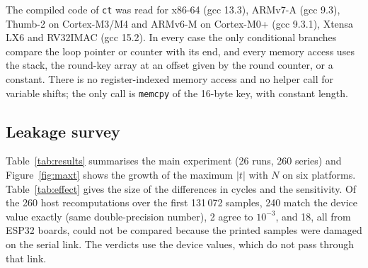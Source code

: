 \documentclass[11pt, a4paper, twoside, reqno]{article}
\newcommand{\tsm}{\texttt{small}}
\newcommand{\tfa}{\texttt{fast}}
\newcommand{\tfc}{\texttt{fast\_const}}
\newcommand{\tct}{\texttt{ct}}
\newcommand{\tlk}{\texttt{leaky}}
\begin{document}
The compiled code of \tct{} was read for x86-64 (gcc 13.3), ARMv7-A (gcc 9.3), Thumb-2 on Cortex-M3/M4 and ARMv6-M on Cortex-M0+ (gcc 9.3.1), Xtensa LX6 and RV32IMAC (gcc 15.2). In every case the only conditional branches compare the loop pointer or counter with its end, and every memory access uses the stack, the round-key array at an offset given by the round counter, or a constant. There is no register-indexed memory access and no helper call for variable shifts; the only call is \texttt{memcpy} of the 16-byte key, with constant length.

\subsection{Leakage survey}

Table~\ref{tab:results} summarises the main experiment (26 runs, 260 series) and Figure~\ref{fig:maxt} shows the growth of the maximum $|t|$ with $N$ on six platforms. Table~\ref{tab:effect} gives the size of the differences in cycles and the sensitivity. Of the 260 host recomputations over the first 131\,072 samples, 240 match the device value exactly (same double-precision number), 2 agree to $10^{-3}$, and 18, all from ESP32 boards, could not be compared because the printed samples were damaged on the serial link. The verdicts use the device values, which do not pass through that link.

\begin{table}[!htbp]
\centering
\caption{Maximum $|t|$ per implementation and test in the main experiment. Each cell gives the \emph{smaller} of the two values from the two independent runs, so a \textbf{bold} value means that the leak appeared in both runs ($|t|>4.5$ in each). Plain: no leak found. $^{\dagger}$: unclear (only one run above 4.5). $=$: every measurement had the same cycle count. sm = \tsm{}, fa = \tfa{}, fc = \tfc{}, lk = \tlk{}. Cache: memory between the core and the constant tables (Table~\ref{tab:platforms}). $N=10^6$ per run unless stated; the two ESP32 Wi-Fi runs used the same board.}
\label{tab:results}
\footnotesize
\resizebox{\textwidth}{!}{}
\end{table}

\begin{table}[!htbp]
\centering
\caption{Size of the timing differences in the main experiment, Test A, first run: mean of the random class minus mean of the fixed class, in cycles ($^{\dagger}$ns, $^{\ddagger}$TSC ticks), from the first 131\,072 samples. Mean-shift threshold: shift of the mean at which the expected uncropped $t$ reaches 4.5 at $N=10^6$ (not a detection power), median and range over all implementations and both tests of the platform; intact dumps only.}
\label{tab:effect}
\footnotesize

\end{table}
\end{document}
